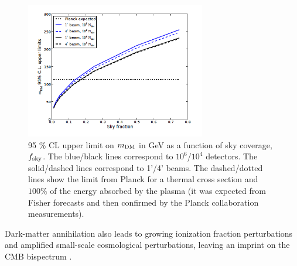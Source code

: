 \begin{figure}[t]
\begin{center}
\includegraphics[width=0.7\textwidth]{DarkEnergy/DM_annihilation_CMBS4.png}
\caption{95 \% CL upper limit on $m_{\rm DM}$ in GeV as a function of sky coverage, $f_{\rm sky}$.
The blue/black lines correspond to $10^6$/$10^4$ detectors. The solid/dashed lines correspond to 1'/4' beams.
The dashed/dotted lines show the limit from Planck for a thermal cross section and $100\%$ of the energy absorbed by the plasma (it was expected from Fisher forecasts and then confirmed by the Planck collaboration measurements).}\label{fig:DM_annihilation}
\end{center}
\end{figure}

Dark-matter annihilation also leads to growing ionization fraction perturbations and amplified small-scale cosmological perturbations, leaving an imprint on the CMB bispectrum \cite{Dvorkin:2013cga}.

%
